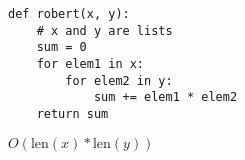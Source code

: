 \question
\begin{lstlisting}
def robert(x, y):
    # x and y are lists
    sum = 0
    for elem1 in x:
        for elem2 in y:
            sum += elem1 * elem2
    return sum
\end{lstlisting}
\begin{solution}[0.25in]
    $O(\text{len}(x)*\text{len}(y))$
\end{solution}
